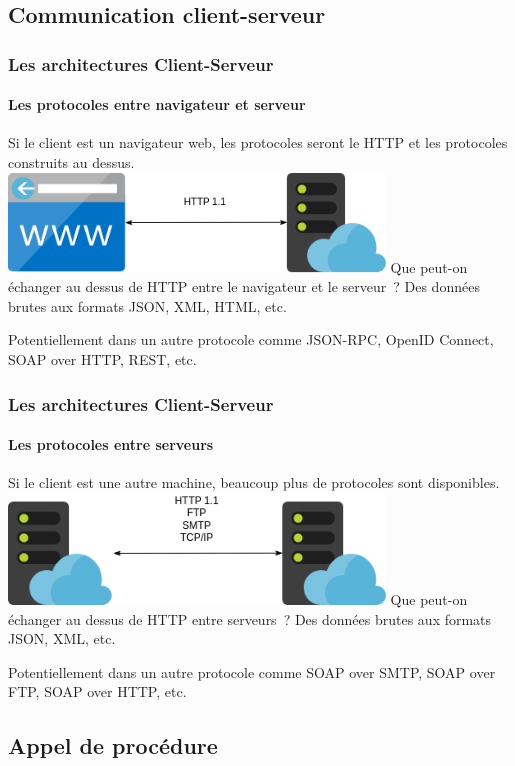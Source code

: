 \documentclass{beamer}
\begin{document}
    \subsection{Communication client-serveur}\label{subsec:web-com-server-client}

    \begin{frame}
        \transdissolve
        \frametitle{Les architectures Client-Serveur}
        \framesubtitle{Les protocoles entre navigateur et serveur}
        Si le client est un navigateur web, les protocoles seront le HTTP et les protocoles construits au dessus.
        \bigbreak
        \centering
        \includegraphics[width=10cm]{image/browser-soa-protocols.drawio}
        \flushleft
        Que peut-on échanger au dessus de HTTP entre le navigateur et le serveur~?
        \pause
        \bigbreak
        Des données brutes aux formats JSON, XML, HTML, etc.

        Potentiellement dans un autre protocole comme JSON-RPC, OpenID Connect, SOAP over HTTP, REST, etc.
    \end{frame}

    \begin{frame}
        \transdissolve
        \frametitle{Les architectures Client-Serveur}
        \framesubtitle{Les protocoles entre serveurs}
        Si le client est une autre machine, beaucoup plus de protocoles sont disponibles.
        \bigbreak
        \centering
        \includegraphics[width=10cm]{image/m2m-soa-protocols.drawio}
        \flushleft
        Que peut-on échanger au dessus de HTTP entre serveurs~?
        \pause
        \bigbreak
        Des données brutes aux formats JSON, XML, etc.

        Potentiellement dans un autre protocole comme SOAP over SMTP, SOAP over FTP, SOAP over HTTP, etc.
    \end{frame}

    \subsection{Appel de procédure}\label{subsec:rpc}
\end{document}
